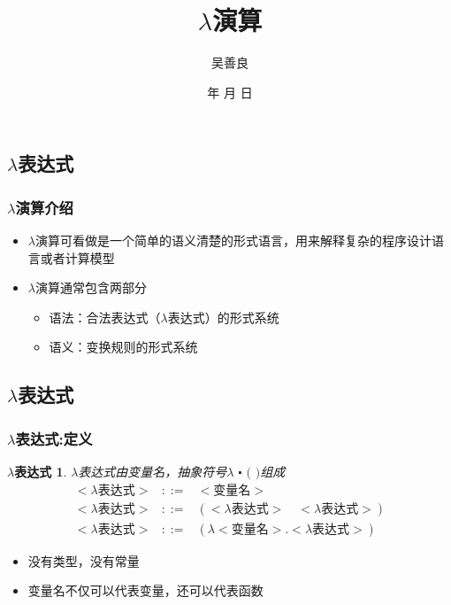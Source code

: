 \documentclass[CJKutf8,compress,hyperref]{beamer}
\renewcommand{\today}{\number\year 年 \number\month 月 \number\day 日}
\begin{document}
\begin{CJK}{UTF8}{song}
 
\title{$\lambda$演算}
\author{吴善良}
\date{ \today}

\frame{\titlepage}
\tableofcontents
\section{$\lambda$表达式}

\begin{frame}
  \frametitle{$\lambda$演算介绍}
  \begin{itemize}
  \item $\lambda$演算可看做是一个简单的语义清楚的形式语言，用来解释复杂的程序设计语言或者计算模型
  \item $\lambda$演算通常包含两部分
    \begin{itemize} 
    \item{语法}：合法表达式（{\color{red}$\lambda$}表达式）的形式系统
    \item{语义}：变换规则的形式系统
    \end{itemize}
  \end{itemize}
\end{frame}

\subsection{ $\lambda$表达式}

\begin{frame}
  \frametitle{$\lambda$表达式:定义}
  \newtheorem{LE}{$\lambda$表达式} 
  \begin{LE}
    $\lambda$表达式由变量名，抽象符号$\lambda$  $\centerdot$  $($  $)$组成 
    \begin{eqnarray*}
      <\textrm{$\lambda$表达式}> & ::= & <\textrm{变量名}> \\
      <\textrm{$\lambda$表达式}> & ::= & (<\textrm{$\lambda$表达式}>\quad<\textrm{$\lambda$表达式}>) \\ 
      <\textrm{$\lambda$表达式}> & ::= & (\lambda<\textrm{变量名}>.<\textrm{$\lambda$表达式}>)  
    \end{eqnarray*} 
  \end{LE}      
  \begin{itemize}
  \item 没有类型，没有常量 
  \item 变量名不仅可以代表变量，还可以代表{\color{red}函数}
  \end{itemize}
\end{frame}


\end{CJK}
\end{document}

